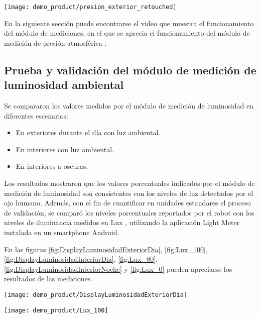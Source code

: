 \begin{center}
\texttt{[image: demo\_product/presion\_exterior\_retouched]}
  \label{fig:presion_exterior_retouched}
\end{center}


En la siguiente sección puede encontrarse el video que muestra el funcionamiento del módulo de mediciones, en el que se aprecia el funcionamiento del módulo de medición de presión atmosférica \cite{Demo_Mediciones}.

\subsection{Prueba y validación del módulo de medición de luminosidad ambiental}

Se compararon los valores medidos por el módulo de medición de luminosidad en diferentes escenarios:

\begin{itemize}
	\item En exteriores durante el día con luz ambiental.
	\item En interiores con luz ambiental.
	\item En interiores a oscuras.
\end{itemize}

Los resultados mostraron que los valores porcentuales indicados por el módulo de medición de luminosidad son consistentes con los niveles de luz detectados por el ojo humano. Además, con el fin de cuantificar en unidades estandares el proceso de validación, se comparó los niveles porcentuales reportados por el robot con los niveles de iluminancia medidos en Lux \cite{Wikipedia_Lux}, utilizando la aplicación Light Meter \cite{Playstore_Lightmeter} instalada en un smartphone Android. 

En las figuras \ref{fig:DisplayLuminosidadExteriorDia}, \ref{fig:Lux_100}, \ref{fig:DisplayLuminosidadInteriorDia}, \ref{fig:Lux_80}, \ref{fig:DisplayLuminosidadInteriorNoche} y \ref{fig:Lux_0} pueden apreciarse los resultados de las mediciones.

\begin{center}
\texttt{[image: demo\_product/DisplayLuminosidadExteriorDia]}
  \label{fig:DisplayLuminosidadExteriorDia}
\end{center}

\begin{center}
\texttt{[image: demo\_product/Lux\_100]}
  \label{fig:Lux_100}
\end{center}

